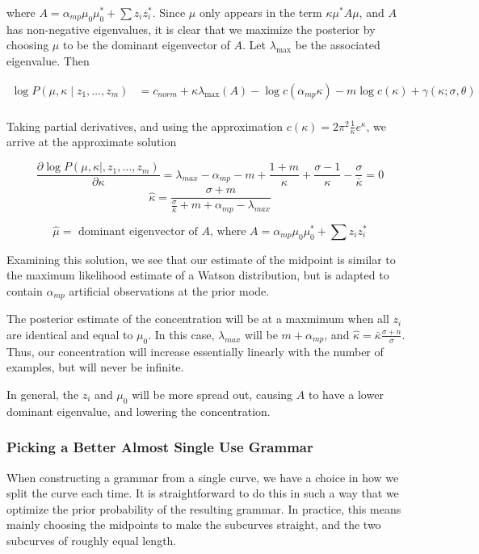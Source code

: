 \documentclass{article}
\begin{document}
where $A = \alpha_{mp} \mu_0 \mu_0^* + \sum z_i z_i^*$.
Since $\mu$ only appears in the term $\kappa \mu^* A \mu$,
and $A$ has non-negative eigenvalues, it is clear
that we maximize the posterior by choosing $\mu$ to be
the dominant eigenvector of $A$.
Let $\lambda_{\max}$ be the associated eigenvalue. Then

\begin{align*}
\log P(\mu, \kappa \mid z_1,\dots,z_m) &= 
c_{norm} + \kappa \lambda_{\max}(A) - 
\log c(\alpha_{mp} \kappa) - m \log c(\kappa) + 
\gamma(\kappa; \sigma, \theta)\\
\end{align*}

Taking partial derivatives, and using the approximation
$c(\kappa) = 2 \pi^2 \frac{1}{\kappa} e^\kappa$,
we arrive at the approximate solution

$$
\frac{\partial \log P(\mu, \kappa \mid, z_1,\dots,z_m)}
{\partial \kappa} = 
\lambda_{max} - \alpha_{mp} -m + \frac{1+m}{\kappa} + 
\frac{\sigma-1}{\kappa} - \frac{\sigma}{\bar{\kappa}} = 0
$$
$$
\widehat{\kappa} = \frac{\sigma+m}{\frac{\sigma}{\bar{\kappa}}
+ m + \alpha_{mp} - \lambda_{max}}
$$

$$
\widehat{\mu} = \mbox{ dominant eigenvector of }
A\mbox{, where } A = \alpha_{mp} \mu_0 \mu_0^* + \sum z_i z_i^*
$$

Examining this solution, we see that our estimate of the
midpoint is similar to the maximum likelihood estimate of
a Watson distribution, but is adapted to contain
$\alpha_{mp}$ artificial observations at the prior mode.

The posterior estimate of the concentration will be at
a maxmimum when all $z_i$ are identical and equal to 
$\mu_0$. In this case, $\lambda_{max}$ will be
$m + \alpha_{mp}$, and $\widehat{\kappa} = 
\bar{\kappa} \frac{\sigma+n}{\sigma}$. Thus, our concentration will
increase essentially linearly with the number of examples, but will never
be infinite.

In general, the $z_i$ and $\mu_0$ will be more spread out, causing $A$
to have a lower dominant eigenvalue, and lowering the concentration.

\subsubsection{Picking a Better Almost Single Use Grammar}

When constructing a grammar from a single curve, we have a choice in
how we split the curve each time. It is straightforward to do this in
such a way that we optimize the prior probability of the resulting
grammar. In practice, this means mainly choosing the midpoints to make
the subcurves straight, and the two subcurves of roughly equal length.
\end{document}
